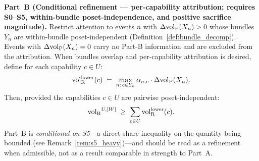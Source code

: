 \begin{theorem}
\medskip\noindent
\textbf{Part~B (Conditional refinement --- per-capability
attribution; requires S0--S5, within-bundle
poset-independence, and positive sacrifice magnitude).}
Restrict attention to events $n$ with $\Delta{\operatorname{vol}_{\mathrm{P}}}(X_n) > 0$
whose bundles $Y_n$ are within-bundle poset-independent
(Definition~\ref{def:bundle_decomp}).  Events with
$\Delta{\operatorname{vol}_{\mathrm{P}}}(X_n) = 0$ carry no Part-B information and are
excluded from the attribution.  When bundles overlap and
per-capability attribution is desired, define for each
capability $c \in U$:
\[
  {\operatorname{vol}_{\mathrm{R}}^{\mathrm{lower}}}(c) \;=\; \max_{n:\, c \in Y_n}
  \alpha_{n,c} \cdot \Delta{\operatorname{vol}_{\mathrm{P}}}(X_n).
\]
Then, provided the capabilities $c \in U$ are pairwise
poset-independent:
\[
  {\operatorname{vol}_{\mathrm{R}}}^{U,[W]} \;\geq\; \sum_{c \in U} {\operatorname{vol}_{\mathrm{R}}^{\mathrm{lower}}}(c).
\]
Part~B is \emph{conditional on S5}---a direct share inequality
on the quantity being bounded (see
Remark~\ref{rem:s5_heavy})---and should be read as a refinement
when admissible, not as a result comparable in strength to
Part~A.
\end{theorem}

